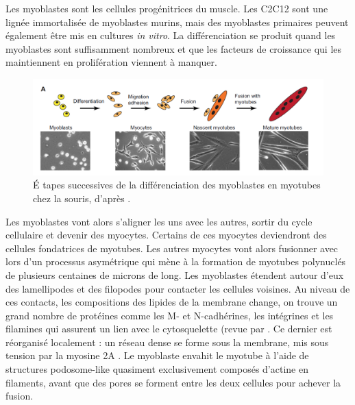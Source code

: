 \documentclass{report}
\begin{document}
Les myoblastes sont les cellules progénitrices du muscle. Les C2C12 sont une lignée immortalisée de myoblastes murins, mais des myoblastes primaires peuvent également être mis en cultures \textit{in vitro}.
La différenciation se produit quand les myoblastes sont suffisamment nombreux et que les facteurs de croissance qui les maintiennent en prolifération viennent à manquer. 
\begin{figure}
\includegraphics[scale=0.4]{Figures/Myoblast_fusion.png} 
\caption{\'E tapes successives de la différenciation des myoblastes en myotubes chez la souris, d'après \cite{abmayr_myoblast_2012}. }
\end{figure}

Les myoblastes vont alors s'aligner les uns avec les autres, sortir du cycle cellulaire et devenir des myocytes. Certains de ces myocytes deviendront des cellules fondatrices de myotubes. Les autres myocytes vont alors fusionner avec lors d'un processus asymétrique qui mène à la formation de myotubes polynuclés de plusieurs centaines de microns de long. 
Les myoblastes étendent autour d'eux des lamellipodes et des filopodes pour contacter les cellules voisines. Au niveau de ces contacts, les compositions des lipides de la membrane change, on trouve un grand nombre de protéines comme les M- et N-cadhérines, les intégrines et les filamines qui assurent un lien avec le cytosquelette (revue par \cite{abmayr_myoblast_2012}. Ce dernier est réorganisé localement : un réseau dense se forme sous la membrane, mis sous tension par la myosine 2A \cite{duan_dependence_2009}. 
Le myoblaste envahit le myotube à l'aide de structures podosome-like quasiment exclusivement composés d'actine en filaments, avant que des pores se forment entre les deux cellules pour achever la fusion. 
\end{document}
